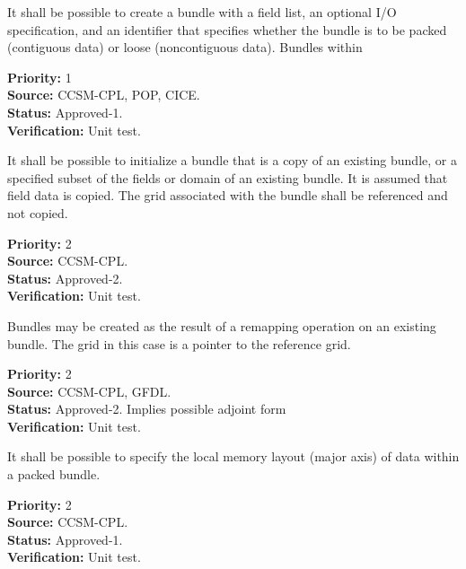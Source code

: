 

\label{req:bundlecreatewalloc}
It shall be possible to create a bundle with a field list, an 
optional I/O specification, and an identifier that specifies whether 
the bundle is to be packed (contiguous data) or loose (noncontiguous data).
Bundles within 
\begin{reqlist}
{\bf Priority:} 1\\
{\bf Source:} CCSM-CPL, POP, CICE. \\
{\bf Status:} Approved-1. \\
{\bf Verification:} Unit test. 
\end{reqlist}

It shall be possible to initialize a bundle that is a copy of an
existing bundle, or a specified subset of the fields or domain of an 
existing bundle. It is assumed that field data is copied.  The grid associated with the 
bundle shall be referenced and not copied.  
\begin{reqlist}
{\bf Priority:} 2 \\
{\bf Source:} CCSM-CPL. \\
{\bf Status:} Approved-2. \\
{\bf Verification:} Unit test. 
\end{reqlist}

Bundles may be created as the result of a remapping operation on an 
existing bundle.  The grid in this case is a pointer to the reference 
grid.
\begin{reqlist}
{\bf Priority:} 2 \\
{\bf Source:} CCSM-CPL, GFDL. \\
{\bf Status:} Approved-2. Implies possible adjoint form\\
{\bf Verification:} Unit test. 
\end{reqlist}



It shall be possible to specify the local memory layout (major axis) 
of data within a packed bundle.  
\begin{reqlist}
{\bf Priority:} 2 \\
{\bf Source:} CCSM-CPL. \\
{\bf Status:} Approved-1. \\
{\bf Verification:} Unit test. 
\end{reqlist}

